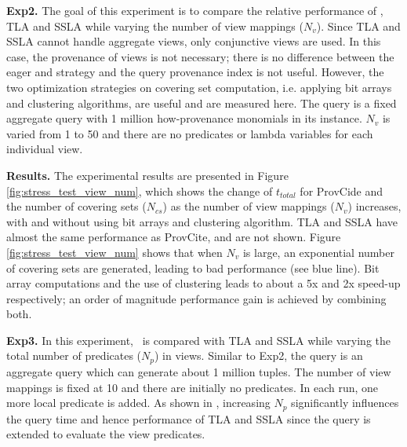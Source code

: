 \textbf{Exp2.} The goal of this experiment is to compare the relative performance of \provalg, TLA and SSLA while varying the number of view mappings ($N_v$). Since TLA and SSLA cannot handle aggregate views, only conjunctive views are used. In this case, the provenance of views is not necessary; there is no difference between the {eager} and {\lazy} strategy and the query provenance index is not useful. 
However, the two optimization strategies on covering set computation, i.e. applying bit arrays and clustering algorithms, are useful and are measured here. The query is a fixed aggregate query with 1 million how-provenance monomials in its instance. $N_v$ is varied from 1 to 50 and there are no predicates or lambda variables for each individual view. 

\textbf{Results.}
The experimental results are presented in Figure \ref{fig:stress_test_view_num}, which shows the change of $t_{total}$ for ProvCide and the number of covering sets ($N_{cs}$) as the number of view mappings ($N_v$) increases, with and without using bit arrays and clustering algorithm. TLA and SSLA have almost the same performance as ProvCite, and are not shown. Figure \ref{fig:stress_test_view_num} shows that when $N_v$ is large, an exponential number of covering sets are generated, leading to bad performance (see blue line). Bit array computations and the use of clustering leads to about a 5x and 2x speed-up respectively; an order of magnitude performance gain is achieved by combining both.


\textbf{Exp3.} In this experiment, \provalg\ is compared with TLA and SSLA while varying the total number of predicates ($N_p$) in views. Similar to Exp2, the query is an aggregate query which can generate about 1 million tuples. The number of view mappings is fixed at 10 and there are initially no predicates. In each run, one more local predicate is added. As shown in \cite{wu2018data}, increasing $N_p$  significantly influences the query time and hence performance of TLA and SSLA since the query is extended to evaluate the view predicates. 

